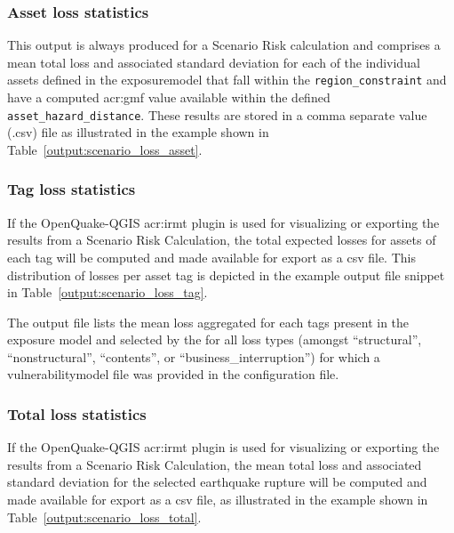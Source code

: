 \subsubsection{Asset loss statistics}
\label{subsubsec:scenario_asset_loss_statistics}

This output is always produced for a Scenario Risk calculation and comprises a
mean total loss and associated standard deviation for each of the individual
\glspl{asset} defined in the \gls{exposuremodel} that fall within the
\Verb+region_constraint+ and have a computed \gls{acr:gmf} value available
within the defined \Verb+asset_hazard_distance+. These results are stored in a
comma separate value (.csv) file as illustrated in the example shown in
Table~\ref{output:scenario_loss_asset}.




\subsubsection{Tag loss statistics}
\label{subsubsec:scenario_tag_loss_statistics}

If the OpenQuake-QGIS \gls{acr:irmt} plugin is used for visualizing or
exporting the results from a Scenario Risk Calculation, the total expected
losses for assets of each \gls{tag} will be computed and made available for
export as a csv file. This distribution of losses per asset \gls{tag} is
depicted in the example output file snippet in
Table~\ref{output:scenario_loss_tag}.



The output file lists the mean loss aggregated for each \glspl{tag}
present in the exposure model and selected by the for all loss types (amongst ``structural'',
``nonstructural'', ``contents'', or ``business\_interruption'') for which a
\gls{vulnerabilitymodel} file was provided in the configuration file.


\subsubsection{Total loss statistics}
\label{subsubsec:scenario_total_loss_statistics}

If the OpenQuake-QGIS \gls{acr:irmt} plugin is used for visualizing or
exporting the results from a Scenario Risk Calculation, the mean total loss
and associated standard deviation for the selected earthquake rupture will be
computed and made available for export as a csv file, as illustrated in the
example shown in Table~\ref{output:scenario_loss_total}.

